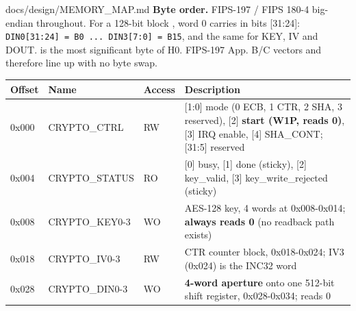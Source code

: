 \begin{relocated}{docs/design/MEMORY_MAP.md}
\textbf{Byte order.} FIPS-197 / FIPS 180-4 big-endian throughout. For a
128-bit block , word 0 carries  in bits
{[}31:24{]}:
\texttt{DIN0[31:\allowbreak{}24]\ =\allowbreak{}\ B0\ .\allowbreak{}.\allowbreak{}.\allowbreak{}\ DIN3[7:\allowbreak{}0]\ =\allowbreak{}\ B15},
and the same for KEY, IV and DOUT.  is the most
significant byte of H0. FIPS-197 App. B/C vectors and
 therefore line up with no byte swap.

{\small\setlength{\tabcolsep}{4pt}

{
\begin{longtable}[]{@{}
  >{\centering\arraybackslash}p{}
  >{\centering\arraybackslash}p{}
  >{\centering\arraybackslash}p{}
  >{\centering\arraybackslash}p{}@{}}
\toprule\noalign{}
\begin{minipage}[b]{\linewidth}\centering
Offset
\end{minipage} & \begin{minipage}[b]{\linewidth}\centering
Name
\end{minipage} & \begin{minipage}[b]{\linewidth}\centering
Access
\end{minipage} & \begin{minipage}[b]{\linewidth}\centering
Description
\end{minipage} \\
\midrule\noalign{}
\endhead
\bottomrule\noalign{}
\endlastfoot
0x000 & CRYPTO\_\allowbreak{}CTRL & RW & {[}1:0{]} mode (0 ECB, 1 CTR, 2
SHA, 3 reserved), {[}2{]} \textbf{start (W1P, reads 0)}, {[}3{]} IRQ
enable, {[}4{]} SHA\_CONT; {[}31:5{]} reserved \\
0x004 & CRYPTO\_\allowbreak{}STATUS & RO & {[}0{]} busy, {[}1{]} done
(sticky), {[}2{]} key\_\allowbreak{}valid, {[}3{]}
key\_\allowbreak{}write\_\allowbreak{}rejected (sticky) \\
0x008 & CRYPTO\_\allowbreak{}KEY0-3 & WO & AES-128 key, 4 words at
0x008-0x014; \textbf{always reads 0} (no readback path exists) \\
0x018 & CRYPTO\_\allowbreak{}IV0-3 & RW & CTR counter block,
0x018-0x024; IV3 (0x024) is the INC32 word \\
0x028 & CRYPTO\_\allowbreak{}DIN0-3 & WO & \textbf{4-word aperture} onto
one 512-bit shift register, 0x028-0x034; reads 0 \\

\end{longtable}}}
\end{relocated}
